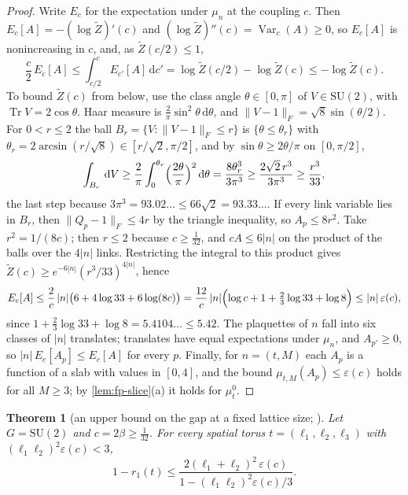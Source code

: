 \documentclass[11pt,a4paper]{amsart}
\newtheorem{theorem}{Theorem}[section]
\theoremstyle{definition}
\theoremstyle{remark}
\numberwithin{equation}{section}
\DeclareMathOperator{\Tr}{Tr}        %
\DeclareMathOperator{\Var}{Var}      %
\newcommand{\norm}[1]{\lVert #1\rVert}     %
\newcommand{\dd}{\,\mathrm{d}}             %
\newcommand{\SU}{\mathrm{SU}}              %
\begin{document}
\begin{proof}
Write $E_{c}$ for the expectation under $\mu_n$ at the coupling $c$. Then $E_c[A]=-(\log\tilde Z)'(c)$ and $(\log\tilde Z)''(c)=\Var_c(A)\ge0$, so $E_c[A]$ is nonincreasing in $c$, and, as $\tilde Z(c/2)\le1$,
\[
\frac c2\,E_c[A]\le\int_{c/2}^cE_{c'}[A]\dd c'=\log\tilde Z(c/2)-\log\tilde Z(c)\le-\log\tilde Z(c).
\]
To bound $\tilde Z(c)$ from below, use the class angle $\theta\in[0,\pi]$ of $V\in\SU(2)$, with $\Tr V=2\cos\theta$. Haar measure is $\frac2\pi\sin^2\theta\dd\theta$, and $\norm{V-1}_F=\sqrt8\sin(\theta/2)$. For $0<r\le2$ the ball $B_r=\{V:\norm{V-1}_F\le r\}$ is $\{\theta\le\theta_r\}$ with $\theta_r=2\arcsin(r/\sqrt8)\in[r/\sqrt2,\pi/2]$, and by $\sin\theta\ge2\theta/\pi$ on $[0,\pi/2]$,
\[
\int_{B_r}\dd V\ge\frac2\pi\int_0^{\theta_r}\Bigl(\frac{2\theta}\pi\Bigr)^2\dd\theta=\frac{8\theta_r^3}{3\pi^3}\ge\frac{2\sqrt2\,r^3}{3\pi^3}\ge\frac{r^3}{33},
\]
the last step because $3\pi^3=93.02\ldots\le66\sqrt2=93.33\ldots$. If every link variable lies in $B_r$, then $\norm{Q_p-1}_F\le4r$ by the triangle inequality, so $A_p\le8r^2$. Take $r^2=1/(8c)$; then $r\le2$ because $c\ge\frac1{32}$, and $cA\le6|n|$ on the product of the balls over the $4|n|$ links. Restricting the integral to this product gives $\tilde Z(c)\ge e^{-6|n|}(r^3/33)^{4|n|}$, hence
\[
E_c[A]\le\frac2c\,|n|\bigl(6+4\log33+6\log(8c)\bigr)=\frac{12}c\,|n|\Bigl(\log c+1+\tfrac23\log33+\log8\Bigr)\le|n|\,\varepsilon(c),
\]
since $1+\frac23\log33+\log8=5.4104\ldots\le5.42$. The plaquettes of $n$ fall into six classes of $|n|$ translates; translates have equal expectations under $\mu_n$, and $A_{p'}\ge0$, so $|n|\,E_c[A_p]\le E_c[A]$ for every $p$. Finally, for $n=(t,M)$ each $A_p$ is a function of a slab with values in $[0,4]$, and the bound $\mu_{t,M}(A_p)\le\varepsilon(c)$ holds for all $M\ge3$; by \cref{lem:fp-slice}(a) it holds for $\mu^0_t$.
\end{proof}

\begin{theorem}[{an upper bound on the gap at a fixed lattice size; \cite[Theorem~8]{bhattacharjee2026first}}]\label{thm:fp-fixed-size}
Let $G=\SU(2)$ and $c=2\beta\ge\frac1{32}$. For every spatial torus $t=(\ell_1,\ell_2,\ell_3)$ with $(\ell_1\ell_2)^2\varepsilon(c)<3$,
\[
1-r_1(t)\le\frac{2(\ell_1+\ell_2)^2\,\varepsilon(c)}{1-(\ell_1\ell_2)^2\varepsilon(c)/3}.
\]
\end{theorem}
\end{document}
